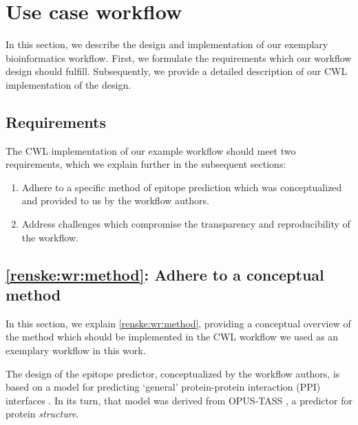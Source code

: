 \section{Use case workflow}
\label{renske:sup:workflow}


In this section, we describe the design and implementation of our exemplary bioinformatics workflow. First, we formulate the requirements which our workflow design should fulfill. Subsequently, we provide a detailed description of our CWL implementation of the design.

\subsection{Requirements}
\label{sec:renske:wf_requirements}


The CWL implementation of our example workflow should meet two requirements, which we explain further in the subsequent sections:

\begin{enumerate}[label=\textbf{WR\arabic*}]
    \item \label{renske:wr:method} Adhere to a specific method of epitope prediction which was conceptualized and provided to us by the workflow authors.
    \item \label{renske:wr:reproducibility} Address challenges which compromise the transparency and reproducibility of the workflow.
\end{enumerate}


\subsection{\ref{renske:wr:method}: Adhere to a conceptual method}
\label{sec:renske:wf_design}

In this section, we explain \ref{renske:wr:method}, providing a conceptual overview of the method which should be implemented in the CWL workflow we used as an exemplary workflow in this work.

The design of the epitope predictor, conceptualized by the workflow authors, is based on a model for predicting `general' protein-protein interaction (PPI) interfaces \cite{capelMultitaskLearningLeverage2022}. In its turn, that model was derived from OPUS-TASS \cite{xuOPUSTASSProteinBackbone2020}, a predictor for protein \emph{structure}. 

